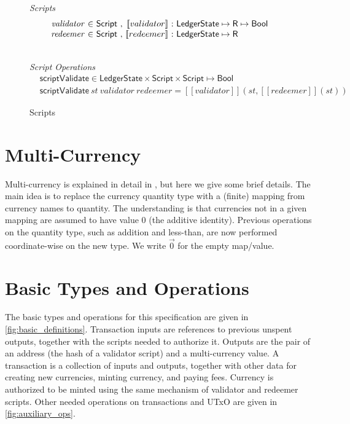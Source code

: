 \documentclass[11pt,a4paper]{article}
\newcommand{\var}[1]{\mathit{#1}}
\newcommand{\fun}[1]{\mathsf{#1}}
\newcommand{\type}[1]{\mathsf{#1}}
\newcommand{\Bool}{\type{Bool}}
\newcommand{\Script}{\type{Script}}
\newcommand{\ScriptEval}[1]{[\![ #1 ]\!]}
\newcommand{\scriptValidate}[3]{\fun{scriptValidate} ~ \var{#1} ~ \var{#2} ~ \var{#3}}
\begin{document}

\begin{figure}
\emph{Scripts}
%
\begin{equation*}
\begin{array}{r@{~\in~}l@{~,~}r@{~:~}l}
  \var{validator}
& \Script
& \ScriptEval{validator}
& \type{LedgerState} \mapsto \type{R} \mapsto \Bool
\\
  \var{redeemer}
& \Script
& \ScriptEval{redeemer}
& \type{LedgerState} \mapsto \type{R}
\end{array}
\end{equation*}

~ ~ ~  \type{R}
\\

\emph{Script Operations}
\begin{align*}
& \fun{scriptValidate} \in
  \type{LedgerState} \times \Script \times \Script \mapsto \Bool \\
& \scriptValidate{st}{validator}{redeemer} =
\ScriptEval{validator} \left(st, \ScriptEval{redeemer}\left(st\right)\right)
\end{align*}

\caption{Scripts}
\label{fig:scripts}
\end{figure}
\section{Multi-Currency}

Multi-currency is explained in detail in \cite{multi_currency}, but here we give some
brief details. The main idea is to replace the currency quantity type with a (finite)
mapping from currency names to quantity. The understanding is that currencies not in
a given mapping are assumed to have value 0 (the additive identity). Previous operations
on the quantity type, such as addition and less-than, are now performed coordinate-wise
on the new type. We write $\vec{0}$ for the empty map/value.

\section{Basic Types and Operations}

The basic types and operations for this specification are given
in \cref{fig:basic_definitions}.  Transaction inputs are references to
previous unspent outputs, together with the scripts needed to authorize it.
Outputs are the pair of an address (the hash of a validator script) and a
multi-currency value. A transaction is a collection of inputs and outputs,
together with other data for creating new currencies, minting currency,
and paying fees. Currency is authorized to be minted using the same
mechanism of validator and redeemer scripts.
Other needed operations on transactions and UTxO are given in 
\cref{fig:auxiliary_ops}.
\end{document}
